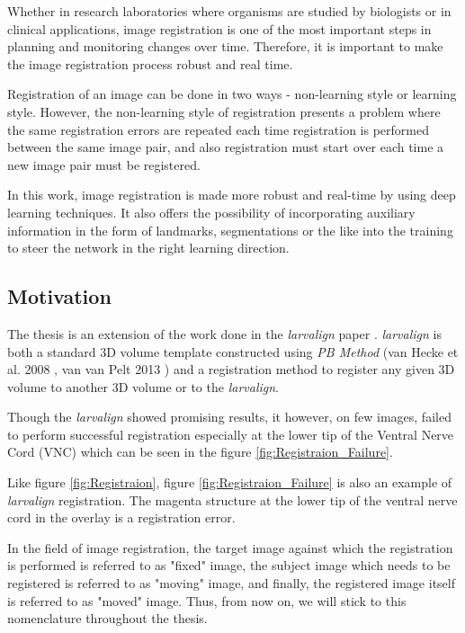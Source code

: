 \documentclass{article}
\begin{document}
	Whether in research laboratories where organisms are studied by biologists or in clinical applications, image registration is one of the most important steps in planning and monitoring changes over time. Therefore, it is important to make the image registration process robust and real time. \newline
	
	Registration of an image can be done in two ways - non-learning style or learning style. However, the non-learning style of registration presents a problem where the same registration errors are repeated each time registration is performed between the same image pair, and also registration must start over each time a new image pair must be registered.\newline
	
	In this work, image registration is made more robust and real-time by using deep learning techniques. It also offers the possibility of incorporating auxiliary information in the form of landmarks, segmentations or the like into the training to steer the network in the right learning direction.

	\subsection{Motivation}
	The thesis is an extension of the work done in the \emph{larvalign} paper \cite{Mu_2018}. \emph{larvalign} is both a standard 3D volume template constructed using \emph{PB Method} (van Hecke et al. 2008 \cite{Hecke_2008}, van van Pelt 2013 \cite{Pelt_2013}) and a registration method to register any given 3D volume to another 3D volume or to the \emph{larvalign}. \newline
	
	Though the \emph{larvalign} showed promising results, it however, on few images, failed to perform successful registration especially at the lower tip of the Ventral Nerve Cord (VNC) which can be seen in the figure \ref{fig:Registraion_Failure}. \newline
		
	Like figure \ref{fig:Registraion}, figure \ref{fig:Registraion_Failure} is also an example of \emph{larvalign} registration. The magenta structure at the lower tip of the ventral nerve cord in the overlay is a registration error. \newline
	
	\begin{tcolorbox}[colback=rwth-blue-5,colframe=rwth-blue-1,title=\textbf{Note}]
		In the field of image registration, the target image against which the registration is performed is referred to as "fixed" image, the subject image which needs to be registered is referred to as "moving" image, and finally, the registered image itself is referred to as "moved" image.
		\tcblower
		Thus, from now on, we will stick to this nomenclature throughout the thesis.
	\end{tcolorbox}
	
\end{document}
